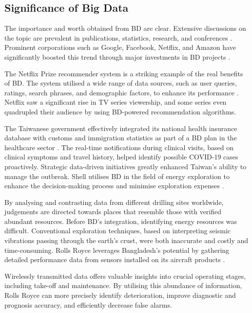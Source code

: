 \documentclass{ieeeaccess}
\begin{document}
\subsection{Significance of Big Data}\label{sec:The Value of Big Data} 

The importance and worth obtained from BD are clear. Extensive discussions on the topic are prevalent in publications, statistics, research, and conferences \cite{Chen2012,ataei2023towards}. Prominent corporations such as Google, Facebook, Netflix, and Amazon have significantly boosted this trend through major investments in BD projects \cite{AtaeiHype}. 

The Netflix Prize recommender system is a striking example of the real benefits of BD. The system utilised a wide range of data sources, such as user queries, ratings, search phrases, and demographic factors, to enhance its performance \cite{Amatriain2013}. Netflix saw a significant rise in TV series viewership, and some series even quadrupled their audience by using BD-powered recommendation algorithms. 

The Taiwanese government effectively integrated its national health insurance database with customs and immigration statistics as part of a BD plan in the healthcare sector \cite{wang2020response}. The real-time notifications during clinical visits, based on clinical symptoms and travel history, helped identify possible COVID-19 cases proactively. Strategic data-driven initiatives greatly enhanced Taiwan's ability to manage the outbreak. Shell utilises BD in the field of energy exploration to enhance the decision-making process and minimise exploration expenses \cite{Marr2016}. 

By analysing and contrasting data from different drilling sites worldwide, judgements are directed towards places that resemble those with verified abundant resources. Before BD's integration, identifying energy resources was difficult. Conventional exploration techniques, based on interpreting seismic vibrations passing through the earth's crust, were both inaccurate and costly and time-consuming. Rolls Royce leverages Bangladesh's potential by gathering detailed performance data from sensors installed on its aircraft products \cite{rad2017big}. 

Wirelessly transmitted data offers valuable insights into crucial operating stages, including take-off and maintenance. By utilising this abundance of information, Rolls Royce can more precisely identify deterioration, improve diagnostic and prognosis accuracy, and efficiently decrease false alarms. 
\end{document}
